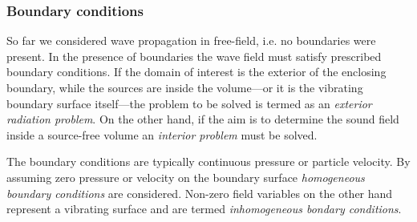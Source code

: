 \subsubsection{Boundary conditions}
\label{Section:Theory:Boundary_conditions}

So far we considered wave propagation in free-field, i.e. no boundaries were present.%
In the presence of boundaries the wave field must satisfy prescribed boundary conditions.
If the domain of interest is the exterior of the enclosing boundary, while the sources are inside the volume---or it is the vibrating boundary surface itself---the problem to be solved is termed as an \emph{exterior radiation problem}. On the other hand, if the aim is to determine the sound field inside a source-free volume an \emph{interior problem} must be solved.

The boundary conditions are typically continuous pressure or particle velocity. By assuming zero pressure or velocity on the boundary surface \emph{homogeneous boundary conditions} are considered. Non-zero field variables on the other hand represent a vibrating surface and are termed \emph{inhomogeneous bondary conditions}.

